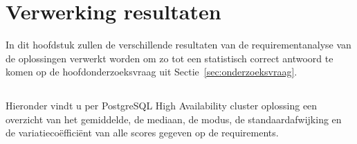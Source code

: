 
\chapter{Verwerking resultaten}
\label{ch:Verwerking resultaten}

In dit hoofdstuk zullen de verschillende resultaten van de requirementanalyse van de oplossingen verwerkt worden om zo tot een statistisch correct antwoord te komen op de hoofdonderzoeksvraag uit Sectie~\ref{sec:onderzoeksvraag}.

\section{}
\label{sec:Resultaten requirements}



Hieronder vindt u per PostgreSQL High Availability cluster oplossing een overzicht van het gemiddelde, de mediaan, de modus, de standaardafwijking en de variatiecoëfficiënt van alle scores gegeven op de requirements.

\begin{table}[!h]
    \centering
    \caption{Statistieken requirements}
    \label{table:Statistieken requirements}
\end{table}

